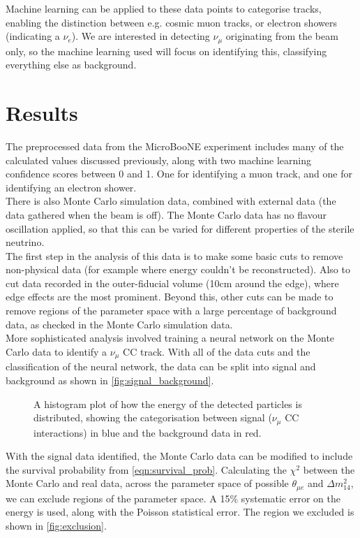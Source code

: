 \documentclass[reprint,
    nofootinbib,
    amsmath,amssymb,
    aps,
    10pt,
    nolongbibliography,
]{revtex4-2}
\begin{document}
Machine learning can be applied to these data points to categorise tracks, enabling the distinction
between e.g. cosmic muon tracks, or electron showers (indicating a $\nu_e$). We are interested in
detecting $\nu_\mu$ originating from the beam only, so the machine learning used will focus on
identifying this, classifying everything else as background.

\section{Results}

The preprocessed data from the MicroBooNE experiment includes many of the calculated values
discussed previously, along with two machine learning confidence scores between 0 and 1. One for
identifying a muon track, and one for identifying an electron shower. \\

There is also Monte Carlo simulation data, combined with external data (the data gathered when the
beam is off). The Monte Carlo data has no flavour oscillation applied, so that this can be varied
for different properties of the sterile neutrino.\\

The first step in the analysis of this data is to make some basic cuts to remove non-physical data 
(for example where energy couldn't be reconstructed). Also to cut data recorded in the
outer-fiducial volume (10\;cm around the edge), where edge effects are the most prominent. Beyond
this, other cuts can be made to remove regions of the parameter space with a large percentage of
background data, as checked in the Monte Carlo simulation data. \\

More sophisticated analysis involved training a neural network on the Monte Carlo data to identify
a $\nu_\mu$ CC track. With all of the data cuts and the classification of the neural network, the
data can be split into signal and background as shown in \autoref{fig:signal_background}.

\begin{figure}[H]
    \centering
      
    \caption{A histogram plot of how the energy of the detected particles is distributed, showing
    the categorisation between signal ($\nu_\mu$ CC interactions) in blue and the background data 
    in red.}
    \label{fig:signal_background}
\end{figure}

With the signal data identified, the Monte Carlo data can be modified to include the survival
probability from \autoref{eqn:survival_prob}. Calculating the $\chi^2$ between the Monte Carlo and 
real data, across the parameter space of
possible $\theta_{\mu e}$ and $\Delta m_{14}^2$, we can exclude regions of the parameter space. A
15\% systematic error on the energy is used, along with the Poisson statistical error. The region we
excluded is shown in \autoref{fig:exclusion}.
\end{document}
